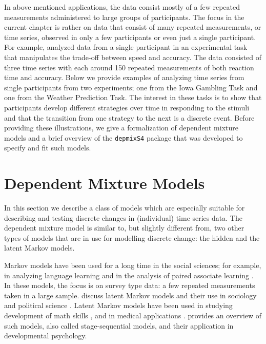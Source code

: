 \documentclass[a4paper,12pt,man]{apa} %
\newcommand{\citep}{\cite}
\newcommand{\citet}{\citeA}
\newcommand{\pkg}{\texttt}
\begin{document}
In above mentioned applications, the data consist mostly of a few
repeated measurements administered to large groups of participants.
The focus in the current chapter is rather on data that consist of
many repeated measurements, or time series, observed in only a few
participants or even just a single participant.  For example,
\citet{Visser2009c} analyzed data from a single participant in an
experimental task that manipulates the trade-off between speed and
accuracy.  The data consisted of three time series with each around
150 repeated measurements of both reaction time and accuracy.  Below
we provide examples of analyzing time series from single participants
from two experiments; one from the Iowa Gambling Task and one from the
Weather Prediction Task.  The interest in these tasks is to show that
participants develop different strategies over time in responding to
the stimuli and that the transition from one strategy to the next is a
discrete event.  Before providing these illustrations, we give a
formalization of dependent mixture models and a brief overview of the
\pkg{depmixS4} package that was developed to specify and fit such
models.


\section{Dependent Mixture Models}

In this section we describe a class of models which are especially
suitable for describing and testing discrete changes in (individual)
time series data.  The dependent mixture model is similar to, but
slightly different from, two other types of models that are in use for
modelling discrete change: the hidden and the latent Markov models.

Markov models have been used for a long time in the social sciences;
for example, in analyzing language learning
\cite{Miller1952,Miller1963} and in the analysis of paired associate
learning \cite{Wickens1982}.  In these models, the focus is on survey
type data: a few repeated measurements taken in a large sample.
 discuss latent Markov models and their use in
sociology and political science \citep<see also>{McCutcheon1987}.  Latent
Markov models have been used in studying development of math skills
\citep{Collins1992}, and in medical applications
\citep{Reboussin1998}.  \citet{Kaplan2008} provides an overview of
such models, also called stage-sequential models, and their
application in developmental psychology.
\end{document}
